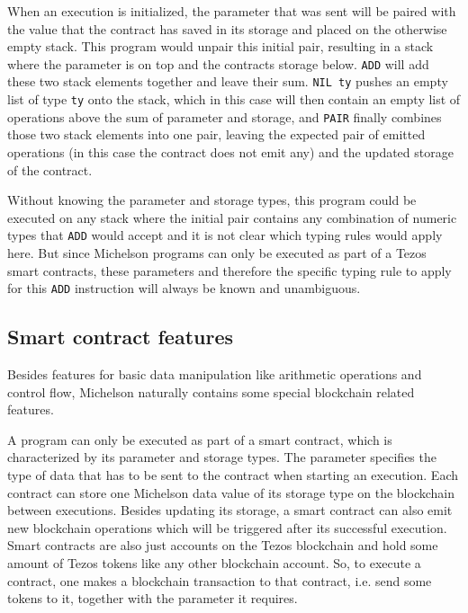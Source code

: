 When an execution is initialized, the parameter that was sent will be paired with the
value that the contract has saved in its storage and placed on the otherwise empty stack.
This program would unpair this initial pair, resulting in a stack where the parameter is
on top and the contracts storage below. \verb/ADD/ will add these two stack elements together
and leave their sum. \verb/NIL ty/ pushes an empty list of type \verb/ty/ onto the stack,
which in this case will then contain an empty list of operations
above the sum of parameter and storage,
and \verb/PAIR/ finally combines those two stack elements into one pair, leaving the expected
pair of emitted operations (in this case the contract does not emit any) and the updated
storage of the contract.

Without knowing the parameter and storage types, this program could be executed on any stack
where the initial pair contains any combination of numeric types that \verb/ADD/ would accept
and it is not clear which typing rules would apply here.
But since Michelson programs can only be executed as part of a Tezos smart contracts,
these parameters and therefore the specific typing rule to apply for this \verb/ADD/ instruction
will always be known and unambiguous.


\subsection{Smart contract features}\label{sec:smart}

Besides features for basic data manipulation like arithmetic operations and control flow,
Michelson naturally contains some special blockchain related features.

A program can only be executed as part of a smart contract,
which is characterized by its parameter and storage types.
The parameter specifies the type of data that has to be sent to the contract when starting
an execution.
Each contract can store one Michelson data value of its storage type
on the blockchain between executions.
Besides updating its storage, a smart contract can also emit new blockchain operations
which will be triggered after its successful execution.
Smart contracts are also just accounts on the Tezos blockchain and hold some amount of Tezos tokens
like any other blockchain account.
So, to execute a contract, one makes a blockchain transaction to that contract,
i.e. send some tokens to it, together with the parameter it requires.

